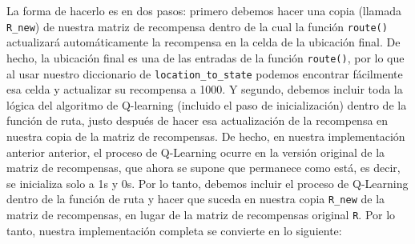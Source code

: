 \documentclass[]{book}
\begin{document}
La forma de hacerlo es en dos pasos: primero debemos hacer una copia (llamada \texttt{R\_new}) de nuestra matriz de recompensa dentro de la cual la función \texttt{route()} actualizará automáticamente la recompensa en la celda de la ubicación final. De hecho, la ubicación final es una de las entradas de la función \texttt{route()}, por lo que al usar nuestro diccionario de \texttt{location\_to\_state} podemos encontrar fácilmente esa celda y actualizar su recompensa a 1000. Y segundo, debemos incluir toda la lógica del algoritmo de Q-learning (incluido el paso de inicialización) dentro de la función de ruta, justo después de hacer esa actualización de la recompensa en nuestra copia de la matriz de recompensas. De hecho, en nuestra implementación anterior anterior, el proceso de Q-Learning ocurre en la versión original de la matriz de recompensas, que ahora se supone que permanece como está, es decir, se inicializa solo a 1s y 0s. Por lo tanto, debemos incluir el proceso de Q-Learning dentro de la función de ruta y hacer que suceda en nuestra copia \texttt{R\_new} de la matriz de recompensas, en lugar de la matriz de recompensas original \texttt{R}. Por lo tanto, nuestra implementación completa se convierte en lo siguiente:
\end{document}
